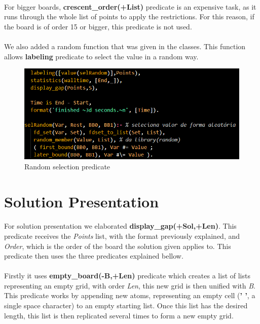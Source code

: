 \documentclass[runningheads]{llncs}
\begin{document}
\paragraph{}
For bigger boards, \textbf{crescent\_order(+List)} predicate is an expensive task, as it runs through the whole list of points to apply the restrictions.
For this reason, if the board is of order 15 or bigger, this predicate is not used.
\paragraph{}
We also added a random function that was given in the classes. This function allows \textbf{labeling} predicate to select the value in a random way.

\begin{figure}
    \begin{center}
        \includegraphics[scale=0.5]{images/random.png}
        \caption{Random selection predicate} \label{fig4}
    \end{center}
\end{figure}

\section{Solution Presentation}
\paragraph{}
For solution presentation we elaborated \textbf{display\_gap(+Sol,+Len)}. This predicate receives the \textit{Points}
list, with the format previously explained, and \textit{Order}, which is the order of the board the solution given applies to.
This predicate then uses the three predicates explained bellow.

\paragraph{}
Firstly it uses \textbf{empty\_board(-B,+Len)} predicate which creates a list of lists representing an empty grid, with order \textit{Len},
this new grid is then unified with \textit{B}.
This predicate works by appending new atoms, representing an empty cell (\textbf{' '},
a single space character) to an empty starting list. Once this list has the desired length, this list is then replicated
several times to form a new empty grid.
\end{document}
